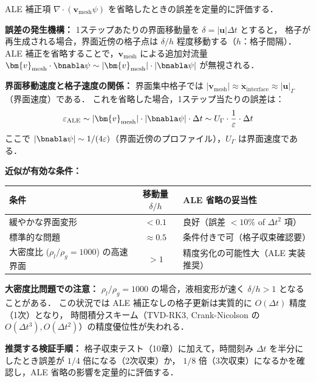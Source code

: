 \begin{tcolorbox}[defbox, title={ALE 省略による精度劣化の定量的見積もり}]
ALE 補正項 $\nabla\cdot(\bm{v}_\text{mesh}\psi)$ を省略したときの誤差を定量的に評価する．

\textbf{誤差の発生機構：}
1ステップあたりの界面移動量を $\delta = |\bm{u}|\Delta t$ とすると，
格子が再生成される場合，界面近傍の格子点は $\delta/h$ 程度移動する（$h$：格子間隔）．
ALE 補正を省略することで，$\bm{v}_\text{mesh}$ による追加対流量 $\bm{v}_\text{mesh}\cdot\bnabla\psi \sim |\bm{v}_\text{mesh}| \cdot |\bnabla\psi|$ が無視される．

\textbf{界面移動速度と格子速度の関係：}
界面集中格子では $|\bm{v}_\text{mesh}| \approx \dot{\bm{x}}_{\text{interface}} \approx |\bm{u}|_{\Gamma}$（界面速度）である．
これを省略した場合，1ステップ当たりの誤差は：
\[
  \varepsilon_{\text{ALE}} \sim |\bm{v}_\text{mesh}| \cdot |\bnabla\psi| \cdot \Delta t \sim U_\Gamma \cdot \frac{1}{\varepsilon} \cdot \Delta t
\]
ここで $|\bnabla\psi| \sim 1/(4\varepsilon)$（界面近傍のプロファイル），$U_\Gamma$ は界面速度である．

\textbf{近似が有効な条件：}
\begin{center}
\renewcommand{\arraystretch}{1.3}
\begin{tabular}{>{\raggedright\arraybackslash}p{48mm}c>{\raggedright\arraybackslash}p{42mm}}
\hline
条件 & 移動量 $\delta/h$ & ALE 省略の妥当性 \\
\hline
緩やかな界面変形 & $< 0.1$ & 良好（誤差 $< 10\%$ of $\Delta t^2$ 項） \\
標準的な問題 & $\approx 0.5$ & 条件付きで可（格子収束確認要） \\
大密度比 ($\rho_l/\rho_g{=}1000$) の高速界面 & $> 1$ & 精度劣化の可能性大（ALE 実装推奨） \\
\hline
\end{tabular}
\end{center}

\textbf{大密度比問題での注意：}
$\rho_l/\rho_g = 1000$ の場合，液相変形が速く $\delta/h > 1$ となることがある．
この状況では ALE 補正なしの格子更新は実質的に $O(\Delta t)$ 精度（1次）となり，
時間積分スキーム（TVD-RK3, Crank-Nicolson の $O(\Delta t^3), O(\Delta t^2)$）の精度優位性が失われる．

\textbf{推奨する検証手順：}
格子収束テスト（10章）に加えて，時間刻み $\Delta t$ を半分にしたとき誤差が $1/4$ 倍になる（2次収束）か，
$1/8$ 倍（3次収束）になるかを確認し，ALE 省略の影響を定量的に評価する．
\end{tcolorbox}
